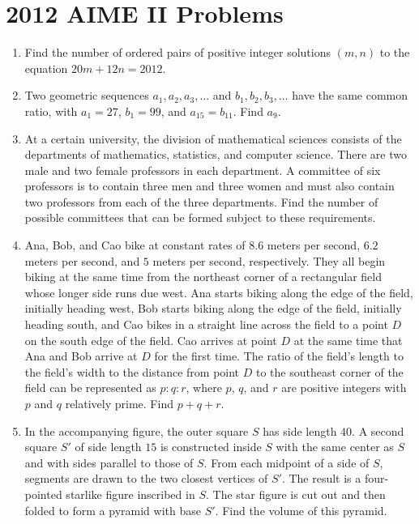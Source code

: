 \documentclass{article}
\begin{document}
\newpage\section*{2012 AIME II Problems}

\begin{enumerate}[label=\arabic*., itemsep=0.5em]
\item Find the number of ordered pairs of positive integer solutions \((m, n)\) to the equation \(20m + 12n = 2012\).\par \vspace{0.5em}\item Two geometric sequences \(a_1, a_2, a_3, \ldots\) and \(b_1, b_2, b_3, \ldots\) have the same common ratio, with \(a_1 = 27\), \(b_1=99\), and \(a_{15}=b_{11}\). Find \(a_9\).\par \vspace{0.5em}\item At a certain university, the division of mathematical sciences consists of the departments of mathematics, statistics, and computer science. There are two male and two female professors in each department. A committee of six professors is to contain three men and three women and must also contain two professors from each of the three departments. Find the number of possible committees that can be formed subject to these requirements.\par \vspace{0.5em}\item Ana, Bob, and Cao bike at constant rates of \(8.6\) meters per second, \(6.2\) meters per second, and \(5\) meters per second, respectively. They all begin biking at the same time from the northeast corner of a rectangular field whose longer side runs due west. Ana starts biking along the edge of the field, initially heading west, Bob starts biking along the edge of the field, initially heading south, and Cao bikes in a straight line across the field to a point \(D\) on the south edge of the field. Cao arrives at point \(D\) at the same time that Ana and Bob arrive at \(D\) for the first time. The ratio of the field's length to the field's width to the distance from point \(D\) to the southeast corner of the field can be represented as \(p : q : r\), where \(p\), \(q\), and \(r\) are positive integers with \(p\) and \(q\) relatively prime. Find \(p+q+r\).\par \vspace{0.5em}\item In the accompanying figure, the outer square \(S\) has side length \(40\). A second square \(S'\) of side length \(15\) is constructed inside \(S\) with the same center as \(S\) and with sides parallel to those of \(S\). From each midpoint of a side of \(S\), segments are drawn to the two closest vertices of \(S'\). The result is a four-pointed starlike figure inscribed in \(S\). The star figure is cut out and then folded to form a pyramid with base \(S'\). Find the volume of this pyramid.


\end{enumerate}
\end{document}
